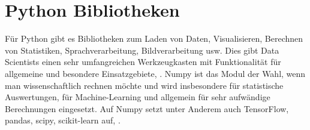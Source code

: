 \chapter{Python Bibliotheken}

Für Python gibt es Bibliotheken zum Laden von Daten, Visualisieren, Berechnen von Statistiken, Sprachverarbeitung, Bildverarbeitung usw. Dies gibt Data Scientists einen sehr umfangreichen Werkzeugkasten mit Funktionalität für allgemeine und besondere Einsatzgebiete, \cite{Mueller:2017}.
Numpy ist das Modul der Wahl, wenn man wissenschaftlich rechnen möchte und wird insbesondere für statistische Auswertungen, für Machine-Learning und allgemein für sehr aufwändige Berechnungen eingesetzt. Auf Numpy setzt unter Anderem auch TensorFlow, pandas, scipy, scikit-learn auf, \cite{Häberlein:2024}.